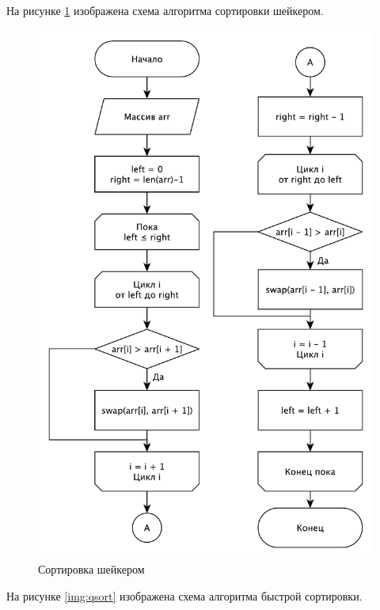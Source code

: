 \documentclass[a4paper,12pt]{article}
\begin{document}
На рисунке \ref{img:shaker} изображена схема алгоритма сортировки шейкером.

\begin{figure}[H]
    \centering
    \includegraphics[scale=0.97]{Shaker}
    \caption{Сортировка шейкером}
    \label{img:shaker}
\end{figure}

На рисунке \ref{img:qsort} изображена схема алгоритма быстрой сортировки.
\end{document}

